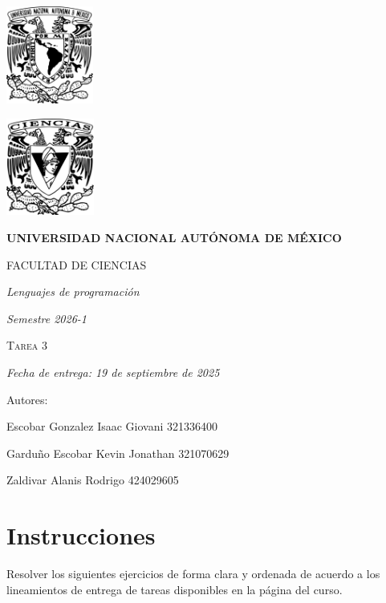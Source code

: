 \documentclass[11pt]{article}
\begin{document}
\begin{titlepage}
    \centering
    \vspace{2cm}
    {\includegraphics[height=3.2cm]{../logo_unam.png}}
    \hfill
    {\includegraphics[height=3.2cm]{../logo_fc.png}\par}
    \vspace{1cm}
    {\bfseries\LARGE UNIVERSIDAD NACIONAL AUTÓNOMA DE MÉXICO \par}
    \vspace{0.7cm}
    {\scshape\Large FACULTAD DE CIENCIAS \par}
    \vspace{1cm}
    {\itshape\Large Lenguajes de programación \par}
    \vspace{0.5cm}
    {\itshape\Large Semestre 2026-1 \par}
    \vspace{2cm}
    {\scshape\Huge Tarea 3 \par}
    \vspace{1cm}
    {\itshape\Large Fecha de entrega: 19 de septiembre de 2025 \par}
    \vspace{2cm}
    {\Large Autores: \par}
    \vspace{0.4cm}
    {\Large Escobar Gonzalez Isaac Giovani \hspace{1cm} 321336400 \par}
    {\Large Garduño Escobar Kevin Jonathan \hspace{0.5cm} 321070629 \par}
    {\Large Zaldivar Alanis Rodrigo \hspace{2.75cm} 424029605 \par}
\end{titlepage}
\section*{Instrucciones}
\noindent Resolver los siguientes ejercicios de forma clara y ordenada de acuerdo a los lineamientos de entrega de tareas disponibles en la página del curso.\\
\end{document}
